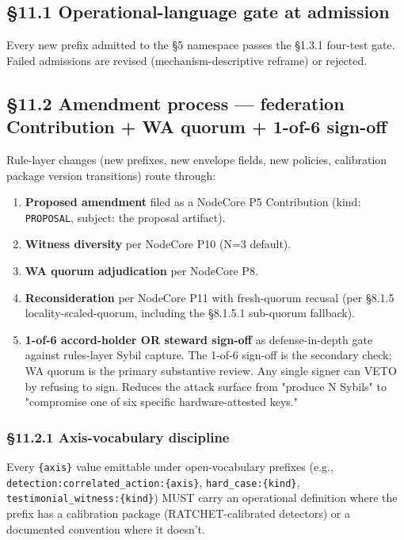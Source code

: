 \documentclass[11pt]{article}
\begin{document}
\subsection*{§11.1 Operational-language gate at admission}


Every new prefix admitted to the §5 namespace passes the §1.3.1 four-test gate. Failed admissions are revised (mechanism-descriptive reframe) or rejected.


\subsection*{§11.2 Amendment process — federation Contribution + WA quorum + 1-of-6 sign-off}


Rule-layer changes (new prefixes, new envelope fields, new policies, calibration package version transitions) route through:


\begin{enumerate}\setlength\itemsep{0pt}
\item \textbf{Proposed amendment} filed as a NodeCore P5 Contribution (kind: \texttt{PROPOSAL}, subject: the proposal artifact).
\item \textbf{Witness diversity} per NodeCore P10 (N=3 default).
\item \textbf{WA quorum adjudication} per NodeCore P8.
\item \textbf{Reconsideration} per NodeCore P11 with fresh-quorum recusal (per §8.1.5 locality-scaled-quorum, including the §8.1.5.1 sub-quorum fallback).
\item \textbf{1-of-6 accord-holder OR steward sign-off} as defense-in-depth gate against rules-layer Sybil capture. The 1-of-6 sign-off is the secondary check; WA quorum is the primary substantive review. Any single signer can VETO by refusing to sign. Reduces the attack surface from "produce N Sybils" to "compromise one of six specific hardware-attested keys."
\end{enumerate}


\subsubsection*{§11.2.1 Axis-vocabulary discipline}


Every \texttt{\{axis\}} value emittable under open-vocabulary prefixes (e.g., \texttt{detection:correlated\_action:\{axis\}}, \texttt{hard\_case:\{kind\}}, \texttt{testimonial\_witness:\{kind\}}) MUST carry an operational definition where the prefix has a calibration package (RATCHET-calibrated detectors) or a documented convention where it doesn't.
\end{document}

